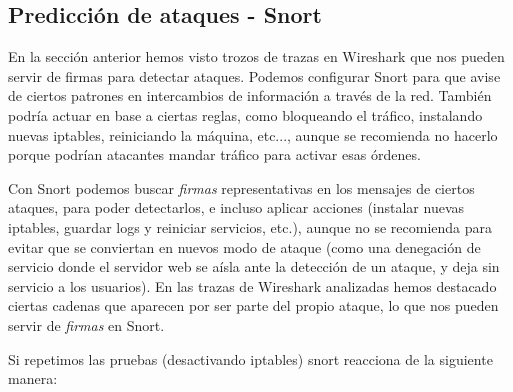 \documentclass[a4paper,12pt]{scrartcl}
\begin{document}
\subsection{Predicción de ataques - Snort}







En la sección anterior hemos visto trozos de trazas en Wireshark que nos pueden servir de firmas para detectar ataques. Podemos configurar Snort para que avise de ciertos patrones en intercambios de información a través de la red. También podría actuar en base a ciertas reglas, como bloqueando el tráfico, instalando nuevas iptables, reiniciando la máquina, etc..., aunque se recomienda no hacerlo porque podrían atacantes mandar tráfico para activar esas órdenes.


Con Snort podemos buscar \textit{firmas} representativas en los mensajes de ciertos ataques, para poder detectarlos, e incluso aplicar acciones (instalar nuevas iptables, guardar logs y reiniciar servicios, etc.), aunque no se recomienda para evitar que se conviertan en nuevos modo de ataque (como una denegación de servicio donde el servidor web se aísla ante la detección de un ataque, y deja sin servicio a los usuarios). En las trazas de Wireshark analizadas hemos destacado ciertas cadenas que aparecen por ser parte del propio ataque, lo que nos pueden servir de \textit{firmas} en Snort.

 




Si repetimos las pruebas (desactivando iptables) snort reacciona de la siguiente manera:

\end{document}
